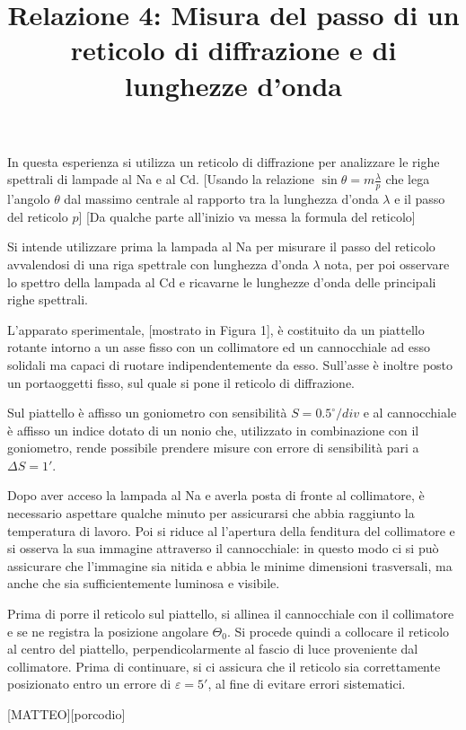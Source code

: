 \documentclass{article}
\title{Relazione 4: Misura del passo di un reticolo di diffrazione
	e di lunghezze d'onda}
\date{}
\begin{document}
	\maketitle
	
	
	In questa esperienza si utilizza un reticolo di diffrazione per analizzare le righe spettrali di lampade al Na e al Cd. [Usando la relazione $\sin{\theta}=m\frac{\lambda}{p}$ che lega l'angolo $\theta$ dal massimo centrale al rapporto tra la lunghezza d'onda $\lambda$ e il passo del reticolo $p$] [Da qualche parte all'inizio va messa la formula del reticolo]
	
	Si intende utilizzare prima la lampada al Na per misurare il passo del reticolo avvalendosi di una riga spettrale con lunghezza d'onda $\lambda$ nota, per poi osservare lo spettro della lampada al Cd e ricavarne le lunghezze d'onda delle principali righe spettrali.
	
	L'apparato sperimentale, [mostrato in Figura 1], è costituito da un piattello rotante intorno a un asse fisso con un collimatore ed un cannocchiale ad esso solidali ma capaci di ruotare indipendentemente da esso. Sull'asse è inoltre posto un portaoggetti fisso, sul quale si pone il reticolo di diffrazione.
	
	Sul piattello è affisso un goniometro con sensibilità $S=0.5^{\circ} / div$ e al cannocchiale è affisso un indice dotato di un nonio che, utilizzato in combinazione con il goniometro, rende possibile prendere misure con errore di sensibilità pari a $\Delta S = 1'$.

 Dopo aver acceso la lampada al Na e averla posta di fronte al collimatore, è necessario aspettare qualche minuto per assicurarsi che abbia raggiunto la temperatura di lavoro. Poi si riduce al l'apertura della fenditura del collimatore e si osserva la sua immagine attraverso il cannocchiale: in questo modo ci si può assicurare che l'immagine sia nitida e abbia le minime dimensioni trasversali, ma anche che sia sufficientemente luminosa e visibile.

Prima di porre il reticolo sul piattello, si allinea il cannocchiale con il collimatore e se ne registra la posizione angolare $\Theta_0$. Si procede quindi a collocare il reticolo al centro del piattello, perpendicolarmente al fascio di luce proveniente dal collimatore. Prima di continuare, si ci assicura che il reticolo sia correttamente posizionato entro un errore di $\varepsilon = 5'$, al fine di evitare errori sistematici.


	
 [MATTEO][porcodio]
 
\end{document}
